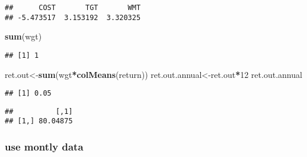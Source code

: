 \documentclass[]{article}
\newenvironment{Shaded}{\begin{snugshade}}{\end{snugshade}}
\newcommand{\CommentTok}[1]{\textcolor[rgb]{0.56,0.35,0.01}{\textit{#1}}}
\newcommand{\DataTypeTok}[1]{\textcolor[rgb]{0.13,0.29,0.53}{#1}}
\newcommand{\DecValTok}[1]{\textcolor[rgb]{0.00,0.00,0.81}{#1}}
\newcommand{\KeywordTok}[1]{\textcolor[rgb]{0.13,0.29,0.53}{\textbf{#1}}}
\newcommand{\NormalTok}[1]{#1}
\newcommand{\OperatorTok}[1]{\textcolor[rgb]{0.81,0.36,0.00}{\textbf{#1}}}
\newcommand{\StringTok}[1]{\textcolor[rgb]{0.31,0.60,0.02}{#1}}
\begin{document}
\begin{verbatim}
##      COST       TGT       WMT 
## -5.473517  3.153192  3.320325
\end{verbatim}

\begin{Shaded}
\begin{Highlighting}[]
\KeywordTok{sum}\NormalTok{(wgt)}
\end{Highlighting}
\end{Shaded}

\begin{verbatim}
## [1] 1
\end{verbatim}

\begin{Shaded}
\begin{Highlighting}[]
\NormalTok{ret.out<-}\KeywordTok{sum}\NormalTok{(wgt}\OperatorTok{*}\KeywordTok{colMeans}\NormalTok{(return))}
\NormalTok{ret.out.annual<-ret.out}\OperatorTok{*}\DecValTok{12}
\NormalTok{ret.out.annual}
\end{Highlighting}
\end{Shaded}

\begin{verbatim}
## [1] 0.05
\end{verbatim}

\begin{Shaded}
\end{Shaded}

\begin{verbatim}
##          [,1]
## [1,] 80.04875
\end{verbatim}

\hypertarget{use-montly-data}{%
\subsubsection{use montly data}\label{use-montly-data}}

\begin{Shaded}
\end{Shaded}
\end{document}
